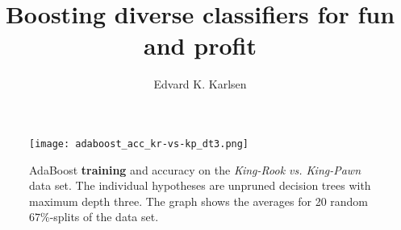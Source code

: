 \documentclass[a4paper,9pt]{article}
\title{Boosting diverse classifiers for fun and profit}
\author{Edvard K. Karlsen}
\date {}
\begin{document}
\maketitle

\begin{SCfigure}
  \label{fig:adaboost_acc_kr-vs-kp_dt3}
  \begin{centering}
    \texttt{[image: adaboost\_acc\_kr-vs-kp\_dt3.png]}
    \caption{
        AdaBoost \textbf{training} and
        \textbf{{\color{red}{testing}}} accuracy on the \emph{King-Rook vs.
        King-Pawn} data set. The individual hypotheses are unpruned decision
        trees with maximum depth three.
        The graph shows the averages for 20 random $67\%$-splits of the data
        set.
    }
  \end{centering}
\end{SCfigure}
\end{document}
